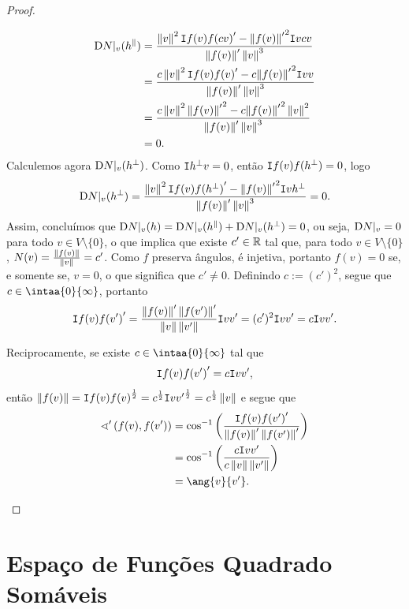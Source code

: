 \begin{proof}
\begin{enumerate}
	\begin{align*}
	\mathrm{D} N|_v (h^\parallel) &= \frac{\left\Vert{v}\right\Vert^2\mathtt I{f(v)}{f(cv)}' - {\left\Vert{f(v)}\right\Vert'}^2\mathtt I{v}{cv}}{\left\Vert{f(v)}\right\Vert'\left\Vert{v}\right\Vert^3} \\
		&= \frac{c\left\Vert{v}\right\Vert^2\mathtt I{f(v)}{f(v)}' - c{\left\Vert{f(v)}\right\Vert'}^2\mathtt I{v}{v}}{\left\Vert{f(v)}\right\Vert'\left\Vert{v}\right\Vert^3} \\
		&= \frac{c\left\Vert{v}\right\Vert^2{\left\Vert{f(v)}\right\Vert'}^2 - c{\left\Vert{f(v)}\right\Vert'}^2\left\Vert{v}\right\Vert^2}{\left\Vert{f(v)}\right\Vert'\left\Vert{v}\right\Vert^3} \\
		&= 0.
	\end{align*}	
Calculemos agora $\mathrm{D} N|_v (h^\perp)$. Como $\mathtt I{h^\perp}{v} = 0$, então $\mathtt I{f(v)}{f(h^\perp)} = 0$, logo
	\begin{equation*}
	\mathrm{D} N|_v (h^\perp) = \frac{\left\Vert{v}\right\Vert^2\mathtt I{f(v)}{f(h^\perp)}' - {\left\Vert{f(v)}\right\Vert'}^2\mathtt I{v}{h^\perp}}{\left\Vert{f(v)}\right\Vert'\left\Vert{v}\right\Vert^3} = 0.
	\end{equation*}
Assim, concluímos que $\mathrm{D} N|_v (h) = \mathrm{D} N|_v (h^\parallel) + \mathrm{D} N|_v (h^\perp) = 0$, ou seja, $\mathrm{D} N|_v = 0$ para todo $v \in V \setminus \{0\}$, o que implica que existe $c' \in \mathbb{R}$ tal que, para todo $v \in V \setminus \{0\}$, $N(v) = \frac{\left\Vert{f(v)}\right\Vert}{\left\Vert{v}\right\Vert} = c'$. Como $f$ preserva ângulos, é injetiva, portanto $f(v)=0$ se, e somente se, $v=0$, o que significa que $c' \neq 0$. Definindo $c := (c')^2$, segue que $c \in \intaa{0}{\infty}$, portanto
	\begin{equation*}
	\mathtt I{f(v)}{f(v')}' = \frac{\left\Vert{f(v)}\right\Vert'\left\Vert{f(v')}\right\Vert'}{\left\Vert{v}\right\Vert\left\Vert{v'}\right\Vert}\mathtt I{v}{v'} = (c')^2\mathtt I{v}{v'} = c\mathtt I{v}{v'}.
	\end{equation*}
	
Reciprocamente, se existe $c \in \intaa{0}{\infty}$ tal que
	\begin{equation*}
	\mathtt I{f(v)}{f(v')}' = c\mathtt I{v}{v'},
	\end{equation*}
então $\left\Vert{f(v)}\right\Vert = \mathtt I{f(v)}{f(v)}^{\frac{1}{2}} = c^{\frac{1}{2}}\mathtt I{v}{v'}^{\frac{1}{2}} = c^{\frac{1}{2}}\left\Vert{v}\right\Vert$ e segue que
	\begin{align*}
	\sphericalangle' \left( f(v),f(v') \right) &= \cos\inv \left( \frac{\inte{f(v)}{f(v')}'}{\nor{f(v)}'\nor{f(v')}'} \right) \\
		&= \cos\inv \left( \frac{c\inte{v}{v'}}{c\nor{v}\nor{v'}} \right) \\
		&= \ang{v}{v'}. \qedhere
	\end{align*}
	\end{enumerate}
\end{proof}



\section{Espaço de Funções Quadrado Somáveis}

